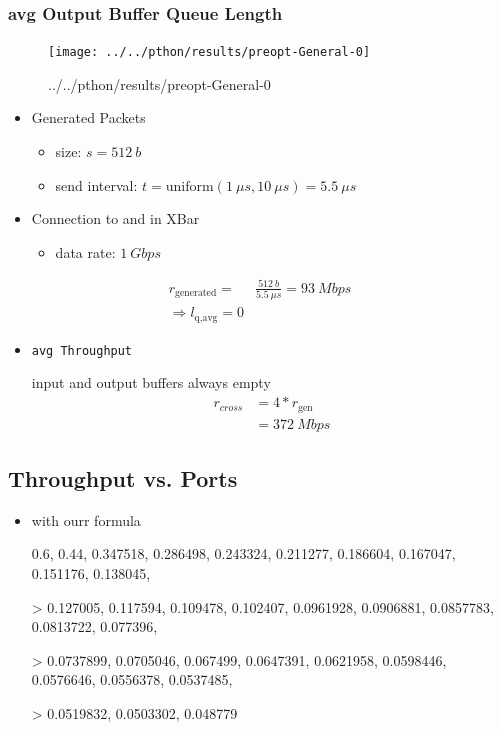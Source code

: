 \documentclass[]{scrartcl}
\begin{document}
    \subsubsection{avg Output Buffer Queue Length}
        \begin{figure}[ht]
            \centering
            \texttt{[image: ../../pthon/results/preopt-General-0]}
            \caption{../../pthon/results/preopt-General-0}%
            \label{fig:../../pthon/results/preopt-General-0}
        \end{figure}
        \begin{itemize}
            \item Generated Packets
                \begin{itemize}
                    \item size: $ s = \SI{512}{b}$
                    \item send interval: $ t = \text{uniform}(\SI{1}{\mu s}, \SI{10}{\mu s}) = \SI{5.5}{\mu s}$
                \end{itemize}
            \item Connection to and in XBar
                \begin{itemize}
                    \item data rate: $\SI{1}{Gbps}$
                \end{itemize}
        \end{itemize}
        \begin{align}
            r_\text{generated} =& \frac{\SI{512}{b}}{\SI{5.5}{\mu s}} = \SI{93}{Mbps}\\
            \Rightarrow l_\text{q,avg} = 0
        \end{align}
    \begin{itemize}
        \item \verb|avg Throughput|

            input and output buffers always empty
            \begin{align}
                r_{cross} &= 4*r_\text{gen}\\
                &= \SI{372}{Mbps}
            \end{align}
    \end{itemize}
    \subsection{Throughput vs. Ports}
    \begin{itemize}
        \item with ourr formula
            {0.6, 0.44, 0.347518, 0.286498, 0.243324, 0.211277, 0.186604, 0.167047, 0.151176, 0.138045,

>    0.127005, 0.117594, 0.109478, 0.102407, 0.0961928, 0.0906881, 0.0857783, 0.0813722, 0.077396,

>    0.0737899, 0.0705046, 0.067499, 0.0647391, 0.0621958, 0.0598446, 0.0576646, 0.0556378, 0.0537485,

>    0.0519832, 0.0503302, 0.048779}
    \end{itemize}
\end{document}
